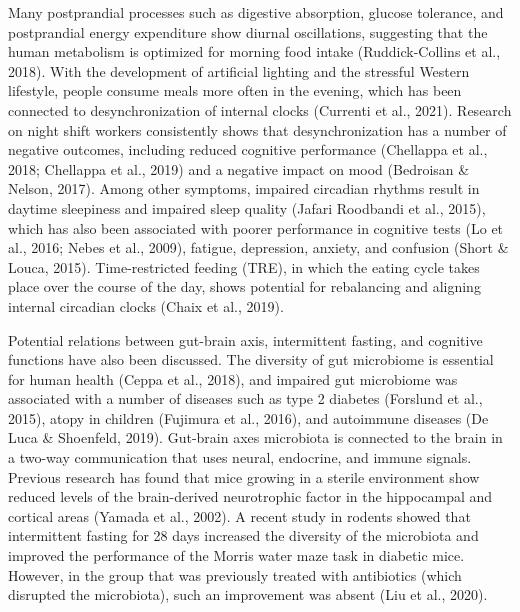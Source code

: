 \documentclass[authordate, empirical]{jote-new-article}
\begin{document}
Many postprandial processes such as digestive absorption, glucose tolerance, and postprandial energy expenditure show diurnal oscillations, suggesting that the human metabolism is optimized for morning food intake (Ruddick-Collins et al., 2018). With the development of artificial lighting and the stressful Western lifestyle, people consume meals more often in the evening, which has been connected to desynchronization of internal clocks (Currenti et al., 2021). Research on night shift workers consistently shows that desynchronization has a number of negative outcomes, including reduced cognitive performance (Chellappa et al., 2018; Chellappa et al., 2019) and a negative impact on mood (Bedroisan \& Nelson, 2017). Among other symptoms, impaired circadian rhythms result in daytime sleepiness and impaired sleep quality (Jafari Roodbandi et al., 2015), which has also been associated with poorer performance in cognitive tests (Lo et al., 2016; Nebes et al., 2009), fatigue, depression, anxiety, and confusion (Short \& Louca, 2015). Time-restricted feeding (TRE), in which the eating cycle takes place over the course of the day, shows potential for rebalancing and aligning internal circadian clocks (Chaix et al., 2019).



Potential relations between gut-brain axis, intermittent fasting, and cognitive functions have also been discussed. The diversity of gut microbiome is essential for human health (Ceppa et al., 2018), and impaired gut microbiome was associated with a number of diseases such as type 2 diabetes (Forslund et al., 2015), atopy in children (Fujimura et al., 2016), and autoimmune diseases (De Luca \& Shoenfeld, 2019). Gut-brain axes microbiota is connected to the brain in a two-way communication that uses neural, endocrine, and immune signals. Previous research has found that mice growing in a sterile environment show reduced levels of the brain-derived neurotrophic factor in the hippocampal and cortical areas (Yamada et al., 2002). A recent study in rodents showed that intermittent fasting for 28 days increased the diversity of the microbiota and improved the performance of the Morris water maze task in diabetic mice. However, in the group that was previously treated with antibiotics (which disrupted the microbiota), such an improvement was absent (Liu et al., 2020).
\end{document}
